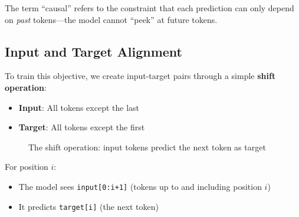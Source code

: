 The term ``causal'' refers to the constraint that each prediction can only depend on \textit{past} tokens---the model cannot ``peek'' at future tokens.

\subsection{Input and Target Alignment}

To train this objective, we create input-target pairs through a simple \textbf{shift operation}:

\begin{itemize}
    \item \textbf{Input}: All tokens except the last
    \item \textbf{Target}: All tokens except the first
\end{itemize}

\begin{figure}[H]
\centering
{}
\caption{The shift operation: input tokens predict the next token as target}
\label{fig:shift-operation}
\end{figure}

For position $i$:
\begin{itemize}
    \item The model sees \texttt{input[0:i+1]} (tokens up to and including position $i$)
    \item It predicts \texttt{target[i]} (the next token)
\end{itemize}

